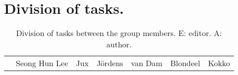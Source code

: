 




\maketitle
\tableofcontents



\chapter{Division of tasks.}

\begin{longtable}{rcccccc}
  \caption{Division of tasks between the group members. E: editor. A: author.} \\
  & Seong Hun Lee & Jux & Jördens & van Dam & Blondeel & Kokko \\
\end{longtable}




